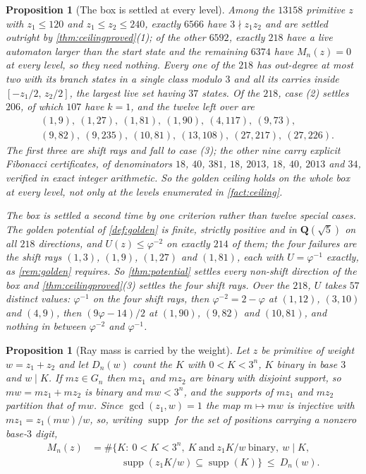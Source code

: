 \documentclass[11pt]{amsart}
\newtheorem{proposition}[theorem]{Proposition}
\theoremstyle{definition}
\theoremstyle{remark}
\begin{document}
\begin{proposition}[The box is settled at every level]
\label{prop:boxsettled}
Among the $13158$ primitive $z$ with $z_1\le 120$ and $z_1\le z_2\le 240$, exactly $6566$ have $3\nmid z_1z_2$ and are settled outright by \cref{thm:ceilingproved}(1); of the other $6592$, exactly $218$ have a live automaton larger than the start state and the remaining $6374$ have $M_n(z)=0$ at every level, so they need nothing. Every one of the $218$ has out-degree at most two with its branch states in a single class modulo $3$ and all its carries inside $[-z_1/2,\,z_2/2]$, the largest live set having $37$ states. Of the $218$, case (2) settles $206$, of which $107$ have $k=1$, and the twelve left over are
\[
\begin{aligned}
&(1,9),\ (1,27),\ (1,81),\ (1,90),\ (4,117),\ (9,73),\\
&(9,82),\ (9,235),\ (10,81),\ (13,108),\ (27,217),\ (27,226).
\end{aligned}
\]
The first three are shift rays and fall to case (3); the other nine carry explicit Fibonacci certificates, of denominators $18$, $40$, $381$, $18$, $2013$, $18$, $40$, $2013$ and $34$, verified in exact integer arithmetic. So the golden ceiling holds on the whole box at every level, not only at the levels enumerated in \cref{fact:ceiling}.

The box is settled a second time by one criterion rather than twelve special cases. The golden potential of \cref{def:golden} is finite, strictly positive and in $\mathbf{Q}(\sqrt5)$ on all $218$ directions, and $U(z)\le\varphi^{-2}$ on exactly $214$ of them; the four failures are the shift rays $(1,3)$, $(1,9)$, $(1,27)$ and $(1,81)$, each with $U=\varphi^{-1}$ exactly, as \cref{rem:golden} requires. So \cref{thm:potential} settles every non-shift direction of the box and \cref{thm:ceilingproved}(3) settles the four shift rays. Over the $218$, $U$ takes $57$ distinct values: $\varphi^{-1}$ on the four shift rays, then $\varphi^{-2}=2-\varphi$ at $(1,12)$, $(3,10)$ and $(4,9)$, then $(9\varphi-14)/2$ at $(1,90)$, $(9,82)$ and $(10,81)$, and nothing in between $\varphi^{-2}$ and $\varphi^{-1}$.
\end{proposition}

\begin{proposition}[Ray mass is carried by the weight]
\label{prop:weightmass}
Let $z$ be primitive of weight $w=z_1+z_2$ and let $D_n(w)$ count the $K$ with $0<K<3^n$, $K$ binary in base $3$ and $w\mid K$. If $mz\in G_n$ then $mz_1$ and $mz_2$ are binary with disjoint support, so $mw=mz_1+mz_2$ is binary and $mw<3^n$, and the supports of $mz_1$ and $mz_2$ partition that of $mw$. Since $\gcd(z_1,w)=1$ the map $m\mapsto mw$ is injective with $mz_1=z_1(mw)/w$, so, writing $\operatorname{supp}$ for the set of positions carrying a nonzero base-$3$ digit,
\[
\begin{aligned}
M_n(z)&=\#\bigl\{K:\ 0<K<3^n,\ K\ \text{and}\ z_1K/w\ \text{binary},\ w\mid K,\\
&\qquad\quad \operatorname{supp}(z_1K/w)\subseteq\operatorname{supp}(K)\bigr\}\ \le\ D_n(w).
\end{aligned}
\]
\end{proposition}
\end{document}
